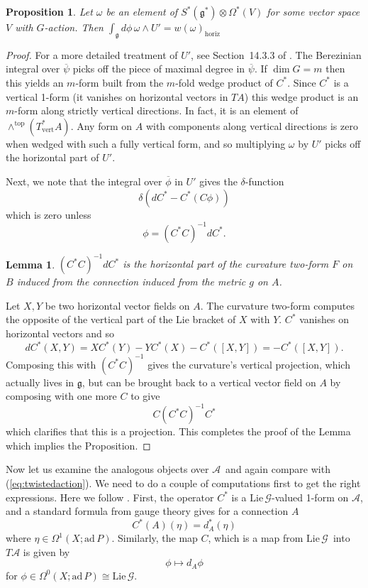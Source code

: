 \documentclass[twoside]{amsart}
\newtheorem{lemma}{Lemma}
\newtheorem{prop}{Proposition}
\renewcommand{\eqref}[1]{(\ref{eq:#1})}
\newcommand{\enm}[1]{\ensuremath{#1}}
\renewcommand{\aa}{\enm{\mathcal{A}}}
\renewcommand{\gg}{\enm{\mathcal{G}}}
\newcommand{\g}{\enm{\mathfrak{g}}}
\renewcommand{\bar}[1]{\overline{#1}}
\newcommand{\ad}{\enm{\mathrm{ad}}}
\newcommand{\formsij}[2]{\ensuremath{\Omega^{#1}({#2})}}
\newcommand{\adp}{\enm{\ad\,P}}
\newcommand{\lieg}{\enm{\mathrm{Lie}\,\gg}}
\begin{document}
\begin{prop}
    Let \( \omega \) be an element of \( S^{*}(\g^{*})\otimes
    \formsij{*}{V} \) for some vector space \( V \) with \( G
    \)-action. Then
    \( \int_{\g} d\phi\, \omega\wedge U' = w(\omega)_{\mathrm{horiz}} \)
\end{prop}
\begin{proof} For a more detailed treatment of \( U' \), see Section~14.3.3
of \cite{cordes}.  The Berezinian integral over \( \bar{\psi} \)
picks off the piece of maximal degree in \( \bar{\psi} \).  If \( \dim
G = m \) then this yields an \( m \)-form built from the \( m \)-fold
wedge product of \( C^{*}.  \) Since \( C^{*} \) is a vertical 1-form
(it vanishes on horizontal vectors in \( TA \)) this wedge product is
an \( m \)-form along strictly vertical directions.  In fact, it is an
element of \( \wedge^{\mathrm{top}}(T^{*}_{\mathrm{vert}}A).  \) Any
form on \( A \) with components along vertical directions is zero when
wedged with such a fully vertical form, and so multiplying \( \omega
\) by \( U' \) picks off the horizontal part of \( U' \).

Next, we note that the integral over \( \bar{\phi} \) in \( U' \)
gives
the \( \delta \)-function
\[ \delta(dC^{*}-C^{*}(C\phi)) \]
which is zero unless
\[ \phi = (C^{*}C)^{-1}dC^{*}. \]
\begin{lemma}
    \( (C^{*}C)^{-1}dC^{*} \) is the horizontal part of the curvature
    two-form \( F \) on \( B \) induced from the connection induced
    from the metric \( g \) on \( A \).
\end{lemma}
\proof Let \( X, Y \) be two horizontal vector fields on \( A \).
The curvature two-form computes the opposite of the vertical part
of the Lie bracket of \(
X \) with \( Y \).  \( C^{*} \) vanishes on horizontal vectors and so
\[ dC^{*}(X, Y) = XC^{*}(Y) - YC^{*}(X) - C^{*}([X,Y]) =
-C^{*}([X,Y]). \]
Composing this with \( (C^{*}C)^{-1} \) gives the curvature's vertical
projection, which actually lives in \g, but can be brought back to a
vertical vector field on \( A \) by composing with one more \( C \)
to give
\[ C(C^{*}C)^{-1}C^{*} \]
which clarifies that this is a projection.  This completes the proof
of the Lemma which implies the Proposition.
\end{proof}

Now let us examine the analogous objects over \aa\ and again compare
with \eqref{twistedaction}. We need to do a couple of computations
first to get the right expressions.  Here we follow
\cite{atiyahjeffrey}.  First, the operator \( C^* \) is a
\lieg-valued 1-form on \aa, and a standard formula from gauge theory
gives for a connection \( A \)
\[ C^*(A)(\eta) = d_A^*(\eta) \]
where \( \eta\in\formsij{1}{X;\adp}. \) Similarly, the map \( C \),
which is a map from \lieg\ into \( T\aa \) is given by
\[ \phi \mapsto d_A\phi \]
for \( \phi\in\formsij{0}{X;\adp}\cong\lieg \).
\end{document}
